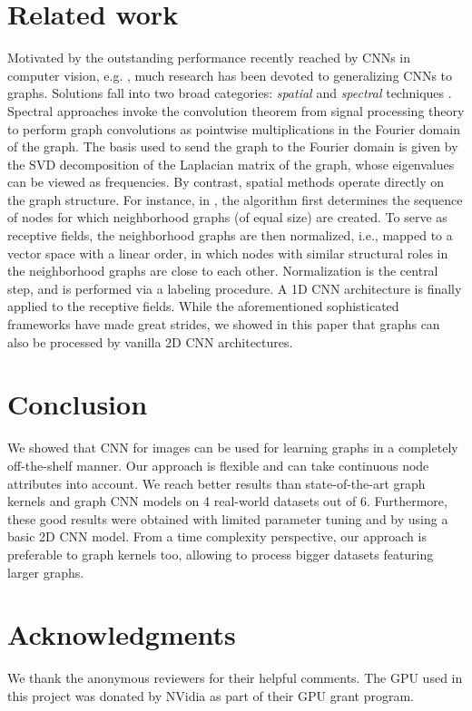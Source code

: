 \documentclass[runningheads]{llncs}
\begin{document}
\section{Related work}
Motivated by the outstanding performance recently reached by CNNs in computer vision, e.g. \cite{vinyals2015show,krizhevsky2012imagenet}, much research has been devoted to generalizing CNNs to graphs.
Solutions fall into two broad categories: \textit{spatial} and \textit{spectral} techniques \cite{bruna2013spectral}. Spectral approaches \cite{defferrard2016convolutional,kipf2016semi} invoke the convolution theorem from signal processing theory to perform graph convolutions as pointwise multiplications in the Fourier domain of the graph. The basis used to send the graph to the Fourier domain is given by the SVD decomposition of the Laplacian matrix of the graph, whose eigenvalues can be viewed as frequencies. By contrast, spatial methods \cite{zhang2018end,niepert2016learning,vialatte2016generalizing} operate directly on the graph structure. For instance, in \cite{niepert2016learning}, the algorithm first determines the sequence of nodes for which neighborhood graphs (of equal size) are created. To serve as receptive fields, the neighborhood graphs are then normalized, i.e., mapped to a vector space with a linear order, in which nodes with similar structural roles in the neighborhood graphs are close to each other. Normalization is the central step, and is performed via a labeling procedure. A 1D CNN architecture is finally applied to the receptive fields.
While the aforementioned sophisticated frameworks have made great strides, we showed in this paper that graphs can also be processed by vanilla 2D CNN architectures.

\vspace{-0.25cm}

\section{Conclusion}
We showed that CNN for images can be used for learning graphs in a completely off-the-shelf manner. Our approach is flexible and can take continuous node attributes into account. We reach better results than state-of-the-art graph kernels and graph CNN models on 4 real-world datasets out of 6. Furthermore, these good results were obtained with limited parameter tuning and by using a basic 2D CNN model. From a time complexity perspective, our approach is preferable to graph kernels too, allowing to process bigger datasets featuring larger graphs.

\section{Acknowledgments}
We thank the anonymous reviewers for their helpful comments. The GPU used in this project was donated by NVidia as part of their GPU grant program.



\end{document}
